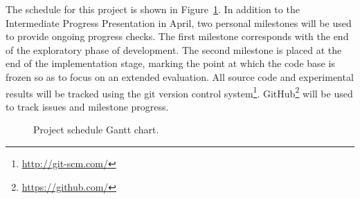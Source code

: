 The schedule for this project is shown in Figure~\ref{fig:gantt}. In
addition to the Intermediate Progress Presentation in April, two
personal milestones will be used to provide ongoing progress
checks. The first milestone corresponds with the end of the
exploratory phase of development. The second milestone is placed at
the end of the implementation stage, marking the point at which the
code base is frozen so as to focus on an extended evaluation. All
source code and experimental results will be tracked using the git
version control system\footnote{\url{http://git-scm.com/}}.
GitHub\footnote{\url{https://github.com/}} will be used to track
issues and milestone progress.

\begin{figure}[t]
\makebox[\textwidth][c]{}
\caption{Project schedule Gantt chart.}
\label{fig:gantt}
\end{figure}
